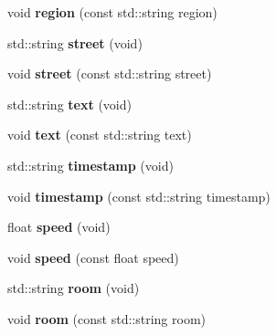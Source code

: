 \begin{DoxyCompactItemize}
\item 
\hypertarget{classGeoloc_a52c077004026244abbf9709889e9e974}{
void {\bfseries region} (const std::string region)}
\label{classGeoloc_a52c077004026244abbf9709889e9e974}

\item 
\hypertarget{classGeoloc_a8545728ebdf5513f2d10158772543160}{
std::string {\bfseries street} (void)}
\label{classGeoloc_a8545728ebdf5513f2d10158772543160}

\item 
\hypertarget{classGeoloc_af0bd3eb1107a5fb12fba5774bea87bec}{
void {\bfseries street} (const std::string street)}
\label{classGeoloc_af0bd3eb1107a5fb12fba5774bea87bec}

\item 
\hypertarget{classGeoloc_a13934fb640d02e94c5974e42580859a7}{
std::string {\bfseries text} (void)}
\label{classGeoloc_a13934fb640d02e94c5974e42580859a7}

\item 
\hypertarget{classGeoloc_a8dbcf61d5423f6cc47933c0f8b9e0840}{
void {\bfseries text} (const std::string text)}
\label{classGeoloc_a8dbcf61d5423f6cc47933c0f8b9e0840}

\item 
\hypertarget{classGeoloc_a4f834ab045c2f001017ab1f5d7428011}{
std::string {\bfseries timestamp} (void)}
\label{classGeoloc_a4f834ab045c2f001017ab1f5d7428011}

\item 
\hypertarget{classGeoloc_a85782a8d68bf49dc0b10822c99a5b7a6}{
void {\bfseries timestamp} (const std::string timestamp)}
\label{classGeoloc_a85782a8d68bf49dc0b10822c99a5b7a6}

\item 
\hypertarget{classGeoloc_a0e64c3bfc09b462d1a25357dd07df992}{
float {\bfseries speed} (void)}
\label{classGeoloc_a0e64c3bfc09b462d1a25357dd07df992}

\item 
\hypertarget{classGeoloc_a5a7a5225bd90a91c229df58bdab76ab3}{
void {\bfseries speed} (const float speed)}
\label{classGeoloc_a5a7a5225bd90a91c229df58bdab76ab3}

\item 
\hypertarget{classGeoloc_a52be86543840b3234b10f4cd3871a261}{
std::string {\bfseries room} (void)}
\label{classGeoloc_a52be86543840b3234b10f4cd3871a261}

\item 
\hypertarget{classGeoloc_a2b6e1491a2c98c716f6a72e11fe7a2a2}{
void {\bfseries room} (const std::string room)}
\label{classGeoloc_a2b6e1491a2c98c716f6a72e11fe7a2a2}


\end{DoxyCompactItemize}
